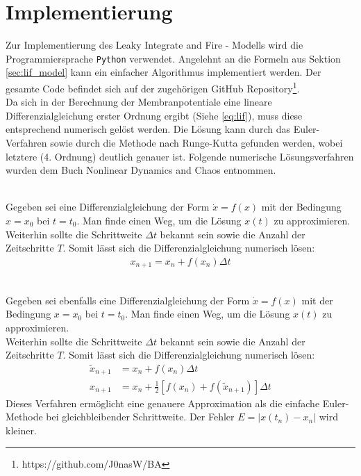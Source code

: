 \section{Implementierung}
\label{sec:lif_imp}
	Zur Implementierung des Leaky Integrate and Fire - Modells wird die Programmiersprache \texttt{Python} verwendet. Angelehnt an die Formeln aus Sektion \ref{sec:lif_model} kann ein einfacher Algorithmus implementiert werden. Der gesamte Code befindet sich auf der zugehörigen GitHub Repository\footnote{https://github.com/J0nasW/BA}.\\
	Da sich in der Berechnung der Membranpotentiale eine lineare Differenzialgleichung erster Ordnung ergibt (Siehe \eqref{eq:lif}), muss diese entsprechend numerisch gelöst werden. Die Lösung kann durch das Euler-Verfahren sowie durch die Methode nach Runge-Kutta gefunden werden, wobei letztere (4. Ordnung) deutlich genauer ist. Folgende numerische Lösungsverfahren wurden dem Buch \glqq Nonlinear Dynamics and Chaos\grqq{} \cite{NonlinearDynamics} entnommen.
	\begin{remark}\\
		Gegeben sei eine Differenzialgleichung der Form $\dot{x} = f(x)$ mit der Bedingung $x = x_0$ bei $t = t_0$. Man finde einen Weg, um die Lösung $x(t)$ zu approximieren.\\
		Weiterhin sollte die Schrittweite $\Delta t$ bekannt sein sowie die Anzahl der Zeitschritte $T$. Somit lässt sich die Differenzialgleichung numerisch lösen:
		\begin{align}
			\label{eq:euler}
			x_{n+1} = x_n + f(x_n) \Delta t
		\end{align}
	\end{remark}
	\begin{remark}\\
		Gegeben sei ebenfalls eine Differenzialgleichung der Form $\dot{x} = f(x)$ mit der Bedingung $x = x_0$ bei $t = t_0$. Man finde einen Weg, um die Lösung $x(t)$ zu approximieren.\\
		Weiterhin sollte die Schrittweite $\Delta t$ bekannt sein sowie die Anzahl der Zeitschritte $T$. Somit lässt sich die Differenzialgleichung numerisch lösen:
		\begin{align}
			\label{eq:erw_euler}
			\tilde{x}_{n+1} &= x_n + f(x_n) \Delta t\\
			x_{n+1} &= x_n + \tfrac{1}{2}[f(x_n) + f(\tilde{x}_{n+1})]\Delta t
		\end{align}
		Dieses Verfahren ermöglicht eine genauere Approximation als die einfache Euler-Methode bei gleichbleibender Schrittweite. Der Fehler $E = |x(t_n)-x_n|$ wird kleiner.
	\end{remark}
